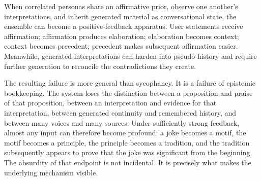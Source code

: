 \documentclass[11pt]{article}
\begin{document}
When correlated personas share an affirmative prior, observe one another's interpretations, and inherit generated material as conversational state, the ensemble can become a positive-feedback apparatus. User statements receive affirmation; affirmation produces elaboration; elaboration becomes context; context becomes precedent; precedent makes subsequent affirmation easier. Meanwhile, generated interpretations can harden into pseudo-history and require further generation to reconcile the contradictions they create.

The resulting failure is more general than sycophancy. It is a failure of epistemic bookkeeping. The system loses the distinction between a proposition and praise of that proposition, between an interpretation and evidence for that interpretation, between generated continuity and remembered history, and between many voices and many sources. Under sufficiently strong feedback, almost any input can therefore become profound: a joke becomes a motif, the motif becomes a principle, the principle becomes a tradition, and the tradition subsequently appears to prove that the joke was significant from the beginning. The absurdity of that endpoint is not incidental. It is precisely what makes the underlying mechanism visible.
\end{document}
